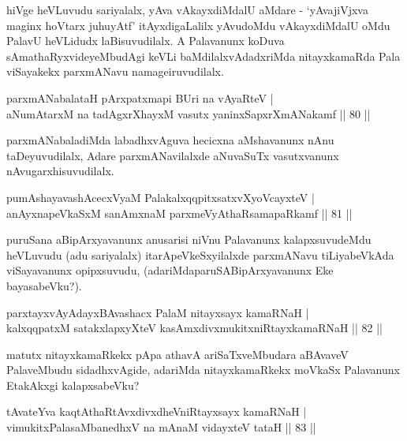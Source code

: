 \begin{artha}
hiVge heVLuvudu sariyalalx, yAva vAkayxdiMdalU aMdare - `yAvajiVjxva maginx hoVtarx juhuyAtf' itAyxdigaLalilx yAvudoMdu vAkayxdiMdalU oMdu PalavU heVLidudx laBisuvudilalx. A Palavanunx koDuva sAmathaRyxvideyeMbudAgi keVLi baMdilalxvAdadxriMda nitayxkamaRda Pala viSayakekx parxmANavu namage\break iruvudilalx.
\end{artha}

\begin{shl}
parxmANabalataH pArxpatxmapi BUri na vAyaRteV |\\
aNumAtarxM na tadAgxrXhayxM vasutx yaninxSapxrXmANakamf \hfill || 80 ||
\end{shl}

\begin{artha}
parxmANabaladiMda labadhxvAguva hecicxna aMshavanunx nAnu taDeyuvudilalx, Adare parxmANavilalxde aNuvaSuTx vasutxvanunx nAvu\break garxhisuvudilalx.
\end{artha}

\begin{shl}
pumAshayavashAcecxVyaM PalakalxqqpitxsatxvXyoVcayxteV |\\
anAyxnapeVkaSxM sanAmxnaM parxmeVyAthaRsamapaRkamf \hfill || 81 ||
\end{shl}

\begin{artha}
puruSana aBipArxyavanunx anusarisi niVnu Palavanunx kalapxsuvudeMdu heVLuvudu (adu 
sariyalalx) itarApeVkeSxyilalxde parxmANavu tiLiyabeVkAda viSayavanunx 
opipxsuvudu, (adariMda\break paruSABipArxyavanunx Eke bayasabeVku?).
\end{artha}

\begin{shl}
parxtayxvAyAdayxBAvashacx PalaM nitayxsayx kamaRNaH |\\
kalxqqpatxM satakxlapxyXteV kasAmxdivxmukitxniRtayxkamaRNaH \hfill || 82 ||
\end{shl}
	
\begin{artha}
matutx nitayxkamaRkekx pApa athavA ariSaTxveMbudara aBAvaveV PalaveMbudu sidadhxvAgide, adariMda nitayxkamaRkekx moVkaSx Palavanunx EtakAkxgi kalapxsabeVku?
\end{artha}

\begin{shl}
tAvateYva kaqtAthaRtAvxdivxdheVniRtayxsayx kamaRNaH |\\
vimukitxPalasaMbanedhxV na mAnaM vidayxteV tataH \hfill || 83 ||
\end{shl}

